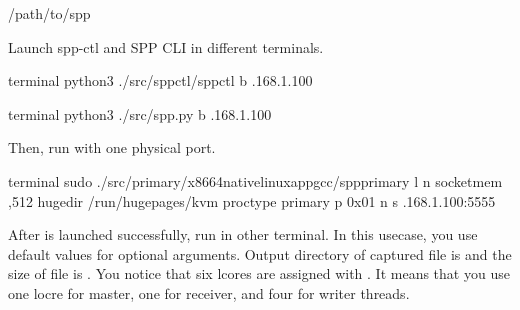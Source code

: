\documentclass[a4paper,11pt,openany,oneside,english]{sphinxmanual}
\begin{document}
\begin{sphinxVerbatim}[commandchars=\\\{\},formatcom=\footnotesize]
  /path/to/spp
\end{sphinxVerbatim}

Launch spp-ctl and SPP CLI in different terminals.

\begin{sphinxVerbatim}[commandchars=\\\{\},formatcom=\footnotesize]
 terminal 
 python3 ./src/spp\PYGZhy{}ctl/spp\PYGZhy{}ctl \PYGZhy{}b .168.1.100
\end{sphinxVerbatim}

\begin{sphinxVerbatim}[commandchars=\\\{\},formatcom=\footnotesize]
 terminal 
 python3 ./src/spp.py \PYGZhy{}b .168.1.100
\end{sphinxVerbatim}

Then, run  with one physical port.

\begin{sphinxVerbatim}[commandchars=\\\{\},formatcom=\footnotesize]
 terminal 
 sudo ./src/primary/x86\PYGZus{}64\PYGZhy{}native\PYGZhy{}linuxapp\PYGZhy{}gcc/spp\PYGZus{}primary 
    \PYGZhy{}l  \PYGZhy{}n  
    \PYGZhy{}\PYGZhy{}socket\PYGZhy{}mem ,512 
    \PYGZhy{}\PYGZhy{}huge\PYGZhy{}dir /run/hugepages/kvm 
    \PYGZhy{}\PYGZhy{}proc\PYGZhy{}type primary 
    \PYGZhy{}\PYGZhy{} 
    \PYGZhy{}p 0x01 
    \PYGZhy{}n  \PYGZhy{}s .168.1.100:5555
\end{sphinxVerbatim}

After  is launched successfully, run  in other
terminal. In this usecase, you use default values for optional arguments.
Output directory of captured file is  and the size of file is
.
You notice that six lcores are assigned with .
It means that you use one locre for master, one for receiver, and four for
writer threads.
\end{document}
